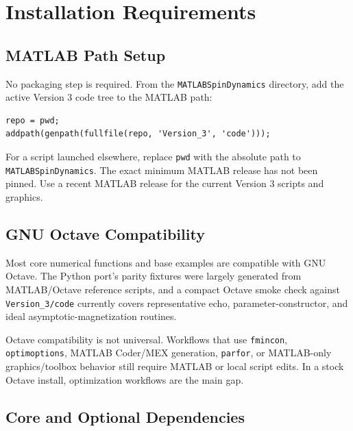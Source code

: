 \documentclass[11pt,oneside]{report}
\newcommand{\code}[1]{\texttt{#1}}
\begin{document}
\chapter{Installation Requirements}

\section{MATLAB Path Setup}

No packaging step is required. From the \code{MATLABSpinDynamics} directory,
add the active Version 3 code tree to the MATLAB path:

\begin{lstlisting}
repo = pwd;
addpath(genpath(fullfile(repo, 'Version_3', 'code')));
\end{lstlisting}

For a script launched elsewhere, replace \code{pwd} with the absolute path to
\code{MATLABSpinDynamics}. The exact minimum MATLAB release has not been pinned.
Use a recent MATLAB release for the current Version 3 scripts and graphics.

\section{GNU Octave Compatibility}

Most core numerical functions and base examples are compatible with GNU Octave.
The Python port's parity fixtures were largely generated from MATLAB/Octave
reference scripts, and a compact Octave smoke check against \code{Version\_3/code}
currently covers representative echo, parameter-constructor, and ideal
asymptotic-magnetization routines.

Octave compatibility is not universal. Workflows that use \code{fmincon},
\code{optimoptions}, MATLAB Coder/MEX generation, \code{parfor}, or MATLAB-only
graphics/toolbox behavior still require MATLAB or local script edits. In a
stock Octave install, optimization workflows are the main gap.

\section{Core and Optional Dependencies}
\end{document}
